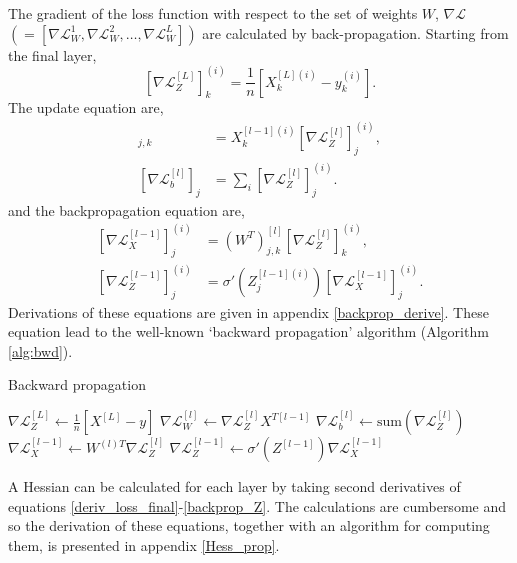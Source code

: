 \documentclass[nohyperref]{article}
\theoremstyle{plain}
\theoremstyle{definition}
\theoremstyle{remark}
\begin{document}
The gradient of the loss function with respect to the set of weights $W$, $\nabla \mathcal{L}$ $(=[\nabla \mathcal{L}^1_{W},\nabla \mathcal{L}^2_{W},\ldots,\nabla \mathcal{L}^L_{W}])$ are calculated by back-propagation. Starting from the final layer,
\begin{equation}
\left[\nabla \mathcal{L}^{[L]}
_{Z}\right]^{(i)}_k=\frac{1}{n}\left[X^{[L](i)}_k-y^{(i)}_k\right].\label{deriv_loss_final}
\end{equation}
The update equation are,
\begin{align}
[\nabla \mathcal{L}^{[l]}_{W}]_{j,k}&=X_{k}^{[l-1](i)}\left[\nabla \mathcal{L}^{[l]}_{Z}\right]^{(i)}_j,\label{gradW}\\
[\nabla \mathcal{L}^{[l]}_{b}]_j&=\sum_{i}\left[\nabla \mathcal{L}^{[l]}_{Z}\right]^{(i)}_j.\label{gradb}
\end{align}
and the backpropagation equation are,
\begin{align}
\left[ \nabla \mathcal{L}^{[l-1]}_{X}\right]^{(i)}_j&=\left(W^{T}\right)_{j,k}^{[l]}\left[\nabla \mathcal{L}^{[l]}_{Z}
\right]^{(i)}_k,\label{backprop_X}\\
\left[\nabla \mathcal{L}_{Z}^{[l-1]}\right]^{(i)}_j&= \sigma'{(Z_{j}^{[l-1](i)})}\left[\nabla \mathcal{L}_{X}^{[l-1]}\right]^{(i)}_j.\label{backprop_Z}\end{align}
Derivations of these equations are given in appendix \ref{backprop_derive}. These equation lead to the well-known `backward propagation' algorithm (Algorithm \ref{alg:bwd}).
\begin{algorithm}
\caption{Backward propagation}\label{alg:bwd}
\begin{algorithmic}
	\STATE $\nabla \mathcal{L}^{[L]}_{Z} \gets \frac{1}{n}\left[X^{[L]}-y \right]$
		\STATE $\nabla \mathcal{L}^{[l]}_{W} \gets  \nabla \mathcal{L}^{[l]}_{Z}X^{T[l-1]} $
		\STATE $\nabla \mathcal{L}^{[l]}_{b} \gets \textrm{sum}{(\nabla \mathcal{L}^{[l]}_{Z})}$
		\STATE $\nabla \mathcal{L}^{[l-1]}_{X} \gets W^{(l)T}\nabla \mathcal{L}^{[l]}_{Z}$
		\STATE $\nabla \mathcal{L}_{Z}^{[l-1]}\gets \sigma'{(Z^{[l-1]})} \nabla \mathcal{L}_{X}^{[l-1]}$
	\ENDFOR
\end{algorithmic}
\end{algorithm}
A Hessian can be calculated for each layer by taking second derivatives of equations \ref{deriv_loss_final}-\ref{backprop_Z}. The calculations are cumbersome and so the derivation of these equations, together with an algorithm for computing them, is presented in appendix \ref{Hess_prop}.
\end{document}

